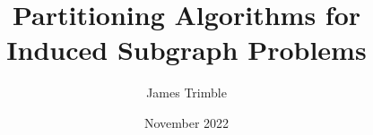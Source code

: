 \documentclass[twoside,hidelinks,nogutter]{glasgowthesis}
\begin{document}
\pagestyle{empty}

\title{Partitioning Algorithms for Induced Subgraph Problems}
\author{James Trimble}
\date{November 2022}

\maketitle

\cleardoublepage

 

% 

% 

\cleardoublepage
\vspace*{1.75in}








\tableofcontents


\cleardoublepage
\pagestyle{fancy}
\setcounter{page}{1}

\nobibliography*

%
\end{document}
